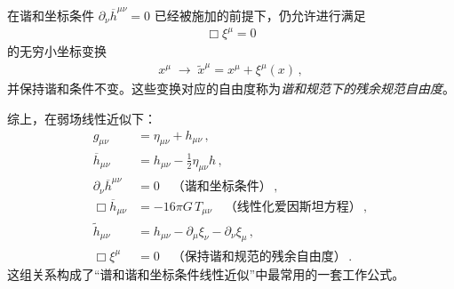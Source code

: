 \begin{definition}[谐和规范下的残余规范变换]
在谐和坐标条件 $\partial_{\nu}\overline{h}^{\mu\nu}=0$ 已经被施加的前提下，仍允许进行满足
\begin{align}
\Box\xi^{\mu} = 0
\end{align}
的无穷小坐标变换
\begin{align}
x^{\mu}\;\longrightarrow\;\widetilde{x}^{\mu}
=
x^{\mu} + \xi^{\mu}(x)\,,
\end{align}
并保持谐和条件不变。这些变换对应的自由度称为\emph{谐和规范下的残余规范自由度}。
\end{definition}


综上，在弱场线性近似下：
\begin{align}
g_{\mu\nu}
&=
\eta_{\mu\nu} + h_{\mu\nu}\,,
\\[0.3em]
\overline{h}_{\mu\nu}
&=
h_{\mu\nu}
-
\frac{1}{2}\eta_{\mu\nu}h\,,
\\[0.3em]
\partial_{\nu}\overline{h}^{\mu\nu} &= 0\quad\text{（谐和坐标条件）}\,,
\\[0.3em]
\Box\overline{h}_{\mu\nu}
&=
-16\pi G\,T_{\mu\nu}\quad\text{（线性化爱因斯坦方程）}\,,
\\[0.3em]
\widetilde{h}_{\mu\nu}
&=
h_{\mu\nu}
-
\partial_{\mu}\xi_{\nu}
-
\partial_{\nu}\xi_{\mu}\,,
\\[0.3em]
\Box\xi^{\mu}
&=
0\quad\text{（保持谐和规范的残余自由度）}\,.
\end{align}
这组关系构成了“谱和谐和坐标条件线性近似”中最常用的一套工作公式。
